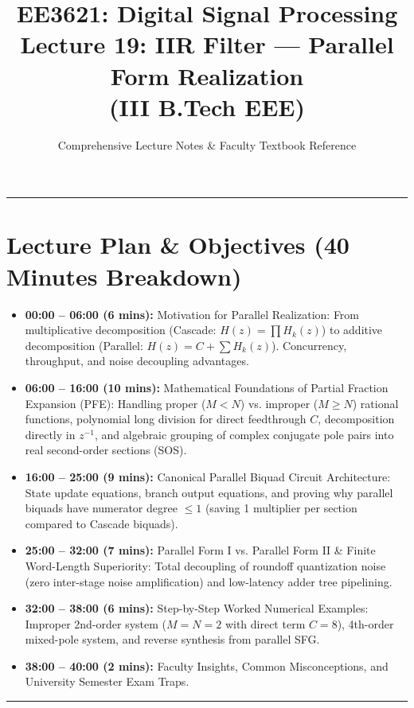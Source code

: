 \documentclass[11pt,a4paper]{article}
\title{\textbf{EE3621: Digital Signal Processing} \\ \Large Lecture 19: IIR Filter — Parallel Form Realization \\ \large (III B.Tech EEE)}
\author{Comprehensive Lecture Notes \& Faculty Textbook Reference}
\date{}
\begin{document}
\maketitle

\noindent\rule{\textwidth}{0.5pt}

\section*{Lecture Plan \& Objectives (40 Minutes Breakdown)}
\begin{itemize}
    \item \textbf{00:00 -- 06:00 (6 mins):} Motivation for Parallel Realization: From multiplicative decomposition (Cascade: $H(z) = \prod H_k(z)$) to additive decomposition (Parallel: $H(z) = C + \sum H_k(z)$). Concurrency, throughput, and noise decoupling advantages.
    \item \textbf{06:00 -- 16:00 (10 mins):} Mathematical Foundations of Partial Fraction Expansion (PFE): Handling proper ($M < N$) vs. improper ($M \ge N$) rational functions, polynomial long division for direct feedthrough $C$, decomposition directly in $z^{-1}$, and algebraic grouping of complex conjugate pole pairs into real second-order sections (SOS).
    \item \textbf{16:00 -- 25:00 (9 mins):} Canonical Parallel Biquad Circuit Architecture: State update equations, branch output equations, and proving why parallel biquads have numerator degree $\le 1$ (saving 1 multiplier per section compared to Cascade biquads).
    \item \textbf{25:00 -- 32:00 (7 mins):} Parallel Form I vs. Parallel Form II \& Finite Word-Length Superiority: Total decoupling of roundoff quantization noise (zero inter-stage noise amplification) and low-latency adder tree pipelining.
    \item \textbf{32:00 -- 38:00 (6 mins):} Step-by-Step Worked Numerical Examples: Improper 2nd-order system ($M=N=2$ with direct term $C=8$), 4th-order mixed-pole system, and reverse synthesis from parallel SFG.
    \item \textbf{38:00 -- 40:00 (2 mins):} Faculty Insights, Common Misconceptions, and University Semester Exam Traps.
\end{itemize}

\noindent\rule{\textwidth}{0.5pt}
\end{document}
